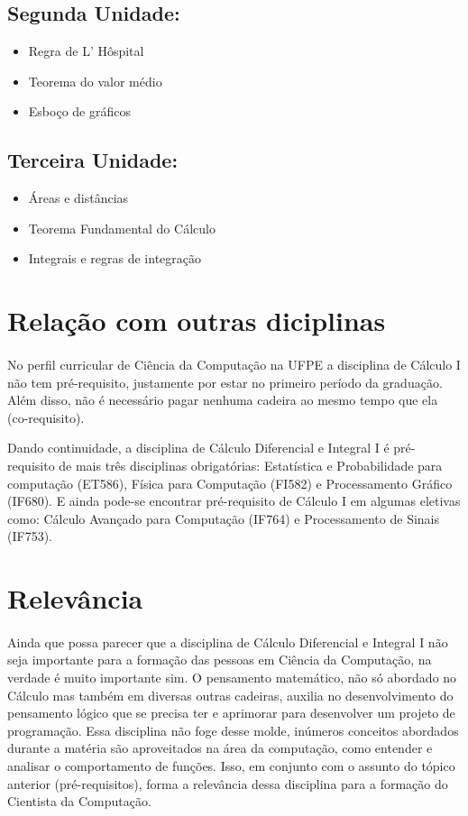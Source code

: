 \documentclass{article}
\begin{document}
\subsection{Segunda Unidade:}
\begin{itemize}
\item Regra de L’ Hôspital
\item Teorema do valor médio
\item Esboço de gráficos
\end{itemize}

\subsection{Terceira Unidade:}
\begin{itemize}
\item Áreas e distâncias
\item Teorema Fundamental do Cálculo
\item Integrais e regras de integração
\end{itemize}

\section{Relação com outras diciplinas}
\paragraph{}
No perfil curricular de Ciência da Computação na UFPE a disciplina de Cálculo I não tem pré-requisito, justamente por estar no primeiro período da graduação. Além disso, não é necessário pagar nenhuma cadeira ao mesmo tempo que ela (co-requisito).

Dando continuidade, a disciplina de Cálculo Diferencial e Integral I é pré-requisito de mais três disciplinas obrigatórias: Estatística e Probabilidade para computação (ET586), Física para Computação (FI582) e Processamento Gráfico (IF680). E ainda pode-se encontrar pré-requisito de Cálculo I em algumas eletivas como: Cálculo Avançado para Computação (IF764) e Processamento de Sinais (IF753).\cite{perfil}

\section{Relevância}
\paragraph{}
Ainda que possa parecer que a disciplina de Cálculo Diferencial e Integral I não seja importante para a formação das pessoas em Ciência da Computação, na verdade é muito importante sim. O pensamento matemático, não só abordado no Cálculo mas também em diversas outras cadeiras, auxilia no desenvolvimento do pensamento lógico que se precisa ter e aprimorar para desenvolver um projeto de programação. Essa disciplina não foge desse molde, inúmeros conceitos abordados durante a matéria são aproveitados na área da computação, como entender e analisar o comportamento de funções. Isso, em conjunto com o assunto do tópico anterior (pré-requisitos), forma a relevância dessa disciplina para a formação do Cientista da Computação.\cite{importancia}
\end{document}
